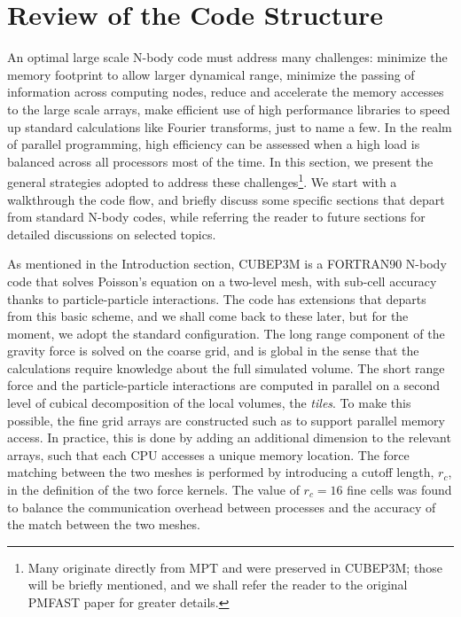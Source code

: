 \documentclass[useAMS,usenatbib]{mn2e}
\begin{document}
%

\section{Review of the Code Structure}
\label{sec:structure}


An optimal large scale N-body code must address many challenges: minimize the memory footprint to allow larger dynamical range,
minimize the passing of information across computing nodes, reduce and accelerate the memory accesses to the large scale arrays, 
make efficient use of high performance libraries to speed up standard calculations like Fourier transforms, just to name a few.
In the realm of parallel programming, high efficiency  can be assessed when a high load is balanced across all processors
most of the time. In this section, we present the general strategies adopted to address these challenges\footnote{ 
Many originate directly from MPT and were preserved in {\small CUBEP3M};
those will be briefly mentioned, and we shall refer the reader to the original {\small PMFAST} paper for greater details.}.
We start with a walkthrough the code flow, and briefly discuss some specific sections that depart from standard N-body codes,
while referring the reader to future sections for detailed discussions on selected topics.


As mentioned in the Introduction section, {\small CUBEP3M} is a {\small FORTRAN90} 
N-body code that solves Poisson's equation on a two-level mesh, 
with sub-cell accuracy thanks to particle-particle interactions. 
The code has extensions that departs from this basic scheme, and
we shall come back to these later, but for the moment, we adopt the 
standard configuration. 
The long range component of the gravity force is solved on the coarse grid, 
and is global in the sense that the calculations require knowledge about the full simulated volume.
The short range force and the particle-particle interactions are computed in parallel on
a second level of cubical decomposition of the local volumes, the {\it tiles}. To make this possible, the fine grid arrays are constructed such as to support parallel memory access. In practice, this is done by adding an additional dimension to the relevant arrays, such that each {\small CPU} accesses a unique memory location. The force matching between the two meshes is performed by introducing a cutoff length, $r_{c}$, in the definition of the two force kernels. The value of $r_{c}=16$ fine cells was found to balance the communication 
overhead between processes and the accuracy of the match between the two meshes. 
\end{document}

